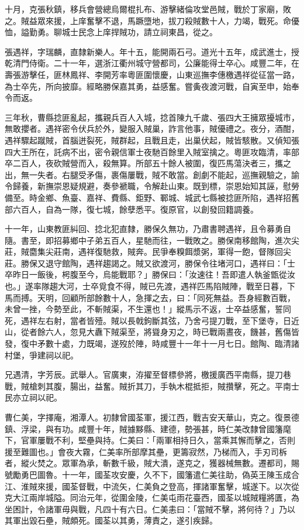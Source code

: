 \begin{pinyinscope}
十月，克張秋鎮，移兵會營總烏爾棍扎布、游擊緒倫攻堂邑賊，戰於丁家廟，敗之。賊益眾來援，上庠奮擊不退，馬蹶墮地，拔刀殺賊數十人，力竭，戰死。命優恤，謚勤勇。聊城士民念上庠捍賊功，請立祠東昌，從之。

張遇祥，字瑞麟，直隸新樂人。年十五，能開兩石弓。道光十五年，成武進士，授乾清門侍衛。二十一年，選浙江衢州城守營都司，公廉能得士卒心。咸豐二年，在壽張游擊任，匪林鳳祥、李開芳率粵匪圍懷慶，山東巡撫李僡檄遇祥從征當一路，為士卒先，所向披靡。經略勝保嘉其勇，益感奮。嘗夤夜渡河戰，自寅至申，始奉令而返。

三年秋，曹縣捻匪亂起，攜親兵百人入城，捻首陳九千歲、張四大王擁眾擾城市，無敢攖者。遇祥密令伏兵於外，變服入賊巢，詐言他事，賊優禮之。夜分，酒酣，遇祥驟起蹴賊，首腦迸裂死，賊群起，且戰且走，出巢伏起，賊皆駭散。又偵知張四大王所在，託病不出，密令親信軍士夜馳百餘里入賊室擒之。粵匪攻臨清，率部卒二百人，夜砍賊營而入，殺無算。所部五十餘人被圍，復匹馬蕩決者三，攜之出，無一失者。右腿受矛傷，裹傷屢戰，賊不敢當。創劇不能起，巡撫親驗之，諭令歸養，新撫崇恩疑規避，奏參褫職，令解赴山東。既到標，崇恩始知其誣，慰勞備至。時金鄉、魚臺、嘉祥、費縣、鉅野、鄆城、城武七縣被捻匪所陷，遇祥招舊部六百人，自為一隊，復七城，餘孽悉平。復原官，以創發回籍調養。

十一年，山東教匪糾回、捻北犯直隸，勝保久無功，乃肅書聘遇祥，且令募勇自隨。書至，即招募鄉中子弟五百人，星馳而往，一戰敗之。勝保南移館陶，進次尖莊，賊麕集尖莊南，遇祥復馳救，賊奔。民爭奉糗餌漿粥，軍得一飽，督隊回尖莊。勝保又退守館陶，遇祥趨謁之。賊又欲渡河，勝保令往堵河口，遇祥曰：「士卒昨日一飯後，枵腹至今，烏能戰耶？」勝保曰：「汝速往！吾即遣人執釜甑從汝也。」遂率隊趨大河，士卒覓食不得，賊已先渡，遇祥匹馬陷賊陣，戰至日暮，下馬而搏。天明，回顧所部餘數十人，急揮之去，曰：「同死無益。吾身經數百戰，未曾一挫，今勢至此，不斬賊渠，不生還也！」縱馬示不返，士卒益感奮，誓同死，遇祥左右射，當者皆殪。賊以長戟鉤斷其弦，乃舍弓提刀戰，至下堡寺，日近山，從者餘六人，忽見大纛下賊渠至，將聳身刃之，時已戰兩晝夜，饑甚，舊傷皆發，復中矛數十處，力既竭，遂歿於陣，時咸豐十一年十一月七日。館陶、臨清諸村堡，爭建祠以祀。

兄遇清，字芳辰。武舉人。官廣東，洊擢至督標參將，檄援廣西平南縣，提刀巷戰，賊槍刺其腹，腸出，益奮。賊折其刀，手執木棍抵拒，賊攢擊，死之。平南士民亦立祠以祀。

曹仁美，字擇庵，湘潭人。初隸曾國荃軍，援江西，戰吉安天華山，克之。復景德鎮、浮梁，與有功。咸豐十年，賊據黟縣、建德，勢張甚，時仁美改隸曾國籓麾下，官軍屢戰不利，堅壘與持。仁美曰：「兩軍相持日久，當乘其懈而擊之，否則援至難圖也。」會夜大霧，仁美率所部摩其壘，更籌寂然，乃梯而入，手刃司柝者，縱火焚之。眾軍為承，斬數千級，賊大潰，遂克之，獲器械無數。遷都司，賜號勵勇巴圖魯。十一年，國荃攻安慶，久不下，國籓遣仁美往助，偽英王陳玉成合江、淮賊來援，國荃督戰，中流矢，仁美負之登高，揮諸軍奮擊，城遂下。以次從克大江兩岸城隘。同治元年，從圍金陵，仁美屯雨花臺西，國荃以城賊糧將匱，為坐困計，令諸軍毋與戰，凡四十有六日。仁美恚曰：「當賊不擊，將何待？」乃以其軍出毀石壘，賊頗死。國荃以其勇，薄責之，遂引疾歸。


\end{pinyinscope}
